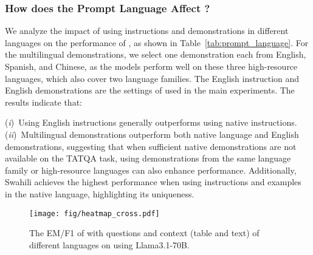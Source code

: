 \subsubsection{How does the Prompt Language Affect \ourmethod?}
We analyze the impact of using instructions and demonstrations in different languages on the performance of \ourmethod, as shown in Table~\ref{tab:prompt_language}. 
For the multilingual demonstrations, we select one demonstration each from English, Spanish, and Chinese, as the models perform well on these three high-resource languages, which also cover two language families. 
The English instruction and English demonstrations are the settings of \ourmethod used in the main experiments. 
The results indicate that:


(\emph{i})~Using English instructions generally outperforms using native instructions.
(\emph{ii})~Multilingual demonstrations outperform both native language and English demonstrations, suggesting that when sufficient native demonstrations are not available on the TATQA task, using demonstrations from the same language family or high-resource languages can also enhance performance.
Additionally, Swahili achieves the highest performance when using instructions and examples in the native language, highlighting its uniqueness. 

\begin{figure}[t]
    \centering
    \texttt{[image: fig/heatmap\_cross.pdf]}
    \caption{
    The EM/F1 of \ourmethod with questions and context (table and text) of different languages on \ourdataset using Llama3.1-70B. 
    }
    \label{fig:heatmap_cross}
\end{figure}

